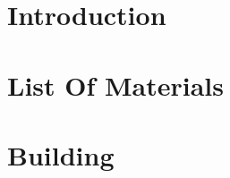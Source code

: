 \documentclass[
    twoside, 
    footinclude=off, 
    captions=tableheading, 
    DIV=12;usenames,
    dvipsnames
]{scrartcl}
\title{\Titel}
\subtitle{\Untertitel}
\author{Authored by: \Autoren}
\date{\Datum}
\begin{document}
    \maketitle
    \tableofcontents
    \section*{Introduction}
        

    \newpage


\newpage
\section{List Of Materials}
    

\newpage
\section{Building}
    


\newpage
    \listoffigures
    \listoftables


%
\end{document}
